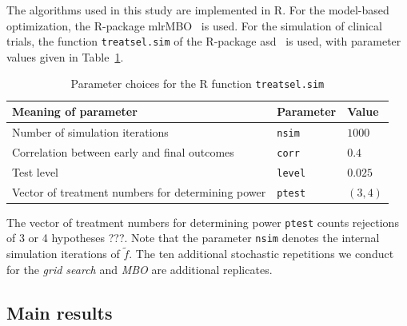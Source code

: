 \documentclass[bimj,fleqn]{w-art}
\theoremstyle{plain}
\theoremstyle{definition}
\begin{document}
The algorithms used in this study are implemented in R.
For the model-based optimization, the R-package mlrMBO~\citep{bischl_mlrmbo_2017} is used.
For the simulation of clinical trials, the function \texttt{treatsel.sim} of the R-package asd~\citep{parsons_software_2011} is used, with parameter values given in Table~\ref{tab:par_implement}.
\begin{table}[h]
  \caption{Parameter choices for the R function \texttt{treatsel.sim}}
  \label{tab:par_implement}
  \centering
  \begin{tabular}{lll}
  \hline
  Meaning of parameter & Parameter & Value \\
  \hline
  Number of simulation iterations & \texttt{nsim} & $1000$ \\
  Correlation between early and final outcomes & \texttt{corr} & $0.4$ \\
  Test level & \texttt{level} & $0.025$ \\
  Vector of treatment numbers for determining power & \texttt{ptest} & $(3,4)$ \\
  \hline
  \end{tabular}
\end{table}
The vector of treatment numbers for determining power \texttt{ptest} counts rejections of 3 or 4 hypotheses ???.
Note that the parameter \texttt{nsim} denotes the internal simulation iterations of $\tilde{f}$. 
The ten additional stochastic repetitions we conduct for the \emph{grid search} and \emph{MBO} are additional replicates.


\subsection{Main results}
\end{document}
